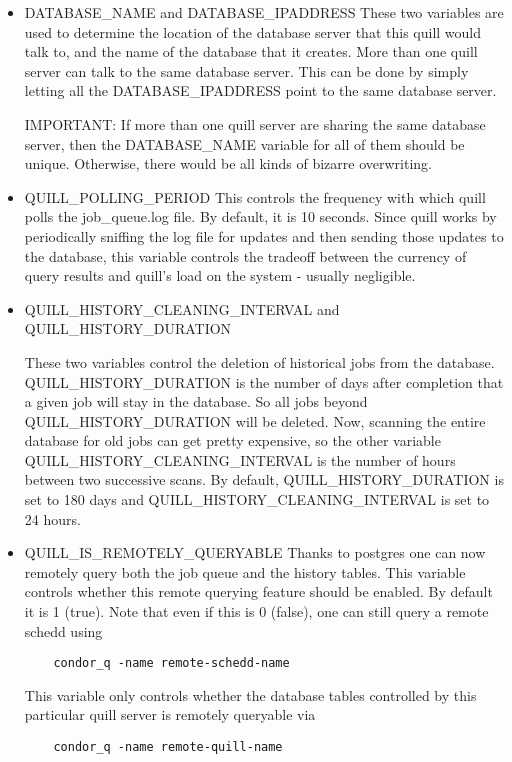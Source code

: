 \begin{enumerate}
\begin{itemize}
\item DATABASE\_NAME and DATABASE\_IPADDRESS
These two variables are used to determine the location of the database
server that this quill would talk to, and the name of the database that
it creates.  More than one quill server can talk to the same database
server.  This can be done by simply letting all the DATABASE\_IPADDRESS
point to the same database server.

IMPORTANT:  If more than one quill server are sharing the same database 
server, then the DATABASE\_NAME variable for all of them should be unique.  
Otherwise, there would be all kinds of bizarre overwriting.

\item QUILL\_POLLING\_PERIOD
This controls the frequency with which quill polls the job\_queue.log file.
By default, it is 10 seconds.  Since quill works by periodically sniffing
the log file for updates and then sending those updates to the database,
this variable controls the tradeoff between the currency of query results
and quill's load on the system - usually negligible.

\item QUILL\_HISTORY\_CLEANING\_INTERVAL and QUILL\_HISTORY\_DURATION 

These two variables control the deletion of historical jobs from
the database.  QUILL\_HISTORY\_DURATION is the number of days after
completion that a given job will stay in the database.  So all jobs beyond
QUILL\_HISTORY\_DURATION will be deleted.  Now, scanning the entire
database for old jobs can get pretty expensive, so the other variable
QUILL\_HISTORY\_CLEANING\_INTERVAL is the number of hours between two
successive scans.  By default, QUILL\_HISTORY\_DURATION is set to 180
days and QUILL\_HISTORY\_CLEANING\_INTERVAL is set to 24 hours.

\item QUILL\_IS\_REMOTELY\_QUERYABLE
Thanks to postgres one can now remotely query both the job queue and the
history tables. This variable controls whether this remote querying 
feature should be enabled.  By default it is 1 (true).  Note that even if 
this is 0 (false), one can still query a remote schedd using 
\begin{verbatim}
	condor_q -name remote-schedd-name
\end{verbatim}
This variable only controls whether the database tables controlled by this 
particular quill server is remotely queryable via
\begin{verbatim}
	condor_q -name remote-quill-name
\end{verbatim}


\end{itemize}
\end{enumerate}
